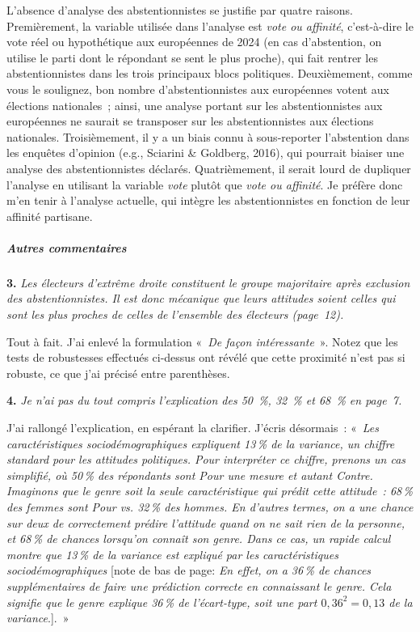 \documentclass[12pt,french]{article}
\begin{document}
L'absence d'analyse des abstentionnistes se justifie par quatre raisons. Premièrement, la variable utilisée dans l'analyse est \textit{vote ou affinité}, c'est-à-dire le vote réel ou hypothétique aux européennes de 2024 (en cas d'abstention, on utilise le parti dont le répondant se sent le plus proche), qui fait rentrer les abstentionnistes dans les trois principaux blocs politiques. Deuxièmement, comme vous le soulignez, bon nombre d'abstentionnistes aux européennes votent aux élections nationales~; ainsi, une analyse portant sur les abstentionnistes aux européennes ne saurait se transposer sur les abstentionnistes aux élections nationales. Troisièmement, il y a un biais connu à sous-reporter l'abstention dans les enquêtes d'opinion (e.g., Sciarini \& Goldberg, 2016), qui pourrait biaiser une analyse des abstentionnistes déclarés. Quatrièmement, il serait lourd de dupliquer l'analyse en utilisant la variable \textit{vote} plutôt que \textit{vote ou affinité}. Je préfère donc m'en tenir à l'analyse actuelle, qui intègre les abstentionnistes en fonction de leur affinité partisane.

\subparagraph*{Autres commentaires}

\bigskip
\noindent\textbf{3.} \textit{Les électeurs d'extrême droite constituent le groupe majoritaire après exclusion des abstentionnistes. Il est donc mécanique que leurs attitudes soient celles qui sont les plus proches de celles de l'ensemble des électeurs (page~12).}

Tout à fait. J'ai enlevé la formulation «~\textit{De façon intéressante}~». Notez que les tests de robustesses effectués ci-dessus ont révélé que cette proximité n'est pas si robuste, ce que j'ai précisé entre parenthèses. %

\bigskip
\noindent\textbf{4.} \textit{Je n'ai pas du tout compris l'explication des 50~\%, 32~\% et 68~\% en page~7.}

J'ai rallongé l'explication, en espérant la clarifier. J'écris désormais~: «~\textit{Les caractéristiques sociodémographiques expliquent 13\,\% de la variance, un chiffre standard pour les attitudes politiques. Pour interpréter ce chiffre, prenons un cas simplifié, où 50\,\% des répondants sont \textit{Pour} une mesure et autant \textit{Contre}. Imaginons que le genre soit la seule caractéristique qui prédit cette attitude~: 68\,\% des femmes sont \textit{Pour} vs. 32\,\% des hommes. En d'autres termes, on a une chance sur deux de correctement prédire l'attitude quand on ne sait rien de la personne, et 68\,\% de chances lorsqu'on connaît son genre. Dans ce cas, un rapide calcul montre que 13\,\% de la variance est expliqué par les caractéristiques sociodémographiques} [note de bas de page: \textit{En effet, on a 36\,\% de chances supplémentaires de faire une prédiction correcte en connaissant le genre. Cela signifie que le genre explique 36\,\% de l'écart-type, soit une part $0,36^2=0,13$ de la variance}.].~»
\end{document}
